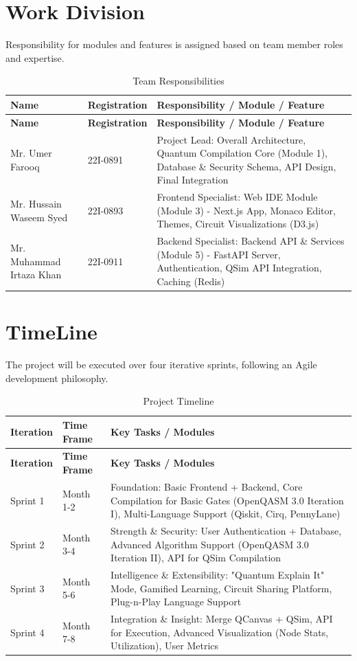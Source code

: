 \section{Work Division}
Responsibility for modules and features is assigned based on team member roles and expertise.
\setlength{\LTleft}{0pt}
\setlength{\LTright}{0pt}
\begin{longtable}{|l|l|p{8cm}|}
\caption{Team Responsibilities}\label{tab:team-resp}\\
\hline
\textbf{Name} & \textbf{Registration} & \textbf{Responsibility / Module / Feature} \\ \hline
\endfirsthead
\hline
\textbf{Name} & \textbf{Registration} & \textbf{Responsibility / Module / Feature} \\ \hline
\endhead
Mr. Umer Farooq & 22I-0891 & Project Lead: Overall Architecture, Quantum Compilation Core (Module 1), Database \& Security Schema, API Design, Final Integration \\ \hline
Mr. Hussain Waseem Syed & 22I-0893 & Frontend Specialist: Web IDE Module (Module 3) - Next.js App, Monaco Editor, Themes, Circuit Visualizations (D3.js) \\ \hline
Mr. Muhammad Irtaza Khan & 22I-0911 & Backend Specialist: Backend API \& Services (Module 5) - FastAPI Server, Authentication, QSim API Integration, Caching (Redis) \\ \hline
\end{longtable}

\section{TimeLine}
The project will be executed over four iterative sprints, following an Agile development philosophy.
\begin{longtable}{|l|l|p{8cm}|}
\caption{Project Timeline}\label{tab:timeline}\\
\hline
\textbf{Iteration} & \textbf{Time Frame} & \textbf{Key Tasks / Modules} \\ \hline
\endfirsthead
\hline
\textbf{Iteration} & \textbf{Time Frame} & \textbf{Key Tasks / Modules} \\ \hline
\endhead
Sprint 1 & Month 1-2 & Foundation: Basic Frontend + Backend, Core Compilation for Basic Gates (OpenQASM 3.0 Iteration I), Multi-Language Support (Qiskit, Cirq, PennyLane) \\ \hline
Sprint 2 & Month 3-4 & Strength \& Security: User Authentication + Database, Advanced Algorithm Support (OpenQASM 3.0 Iteration II), API for QSim Compilation \\ \hline
Sprint 3 & Month 5-6 & Intelligence \& Extensibility: "Quantum Explain It" Mode, Gamified Learning, Circuit Sharing Platform, Plug-n-Play Language Support \\ \hline
Sprint 4 & Month 7-8 & Integration \& Insight: Merge QCanvas + QSim, API for Execution, Advanced Visualization (Node Stats, Utilization), User Metrics \\ \hline
\end{longtable}